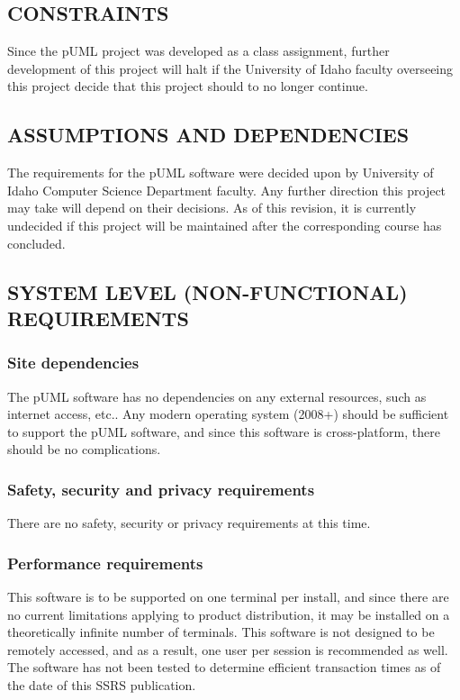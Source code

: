 \documentclass[twoside,letterpaper]{article}
\begin{document}
\subsection[CONSTRAINTS]{\bfseries
CONSTRAINTS}
{
Since the pUML project was developed as a class assignment,
further development of this project will halt if the University of Idaho faculty overseeing this project decide that this project should to no longer continue.
}

\subsection[ASSUMPTIONS AND DEPENDENCIES]{\bfseries
ASSUMPTIONS AND DEPENDENCIES}
{
The requirements for the pUML software were decided upon by University of Idaho Computer Science Department faculty.  Any further direction this project may take will depend on their decisions. As of this revision, it is currently undecided if this project will be maintained after the corresponding course has concluded. 
}




\subsection[SYSTEM LEVEL (NON{}-FUNCTIONAL)
REQUIREMENTS]{\bfseries
SYSTEM LEVEL (NON-FUNCTIONAL) REQUIREMENTS}

\subsubsection[Site dependencies]{\bfseries
Site dependencies}
{
The pUML software has no dependencies on any external resources, such as internet access, etc..
Any modern operating system (2008+) should be sufficient to support the pUML software,
and since this software is cross-platform, there should be no complications.
}

\subsubsection[Safety, security and privacy requirements]{\bfseries
Safety, security and privacy requirements}
{
There are no safety, security or privacy requirements at this time.
}

\subsubsection[Performance requirements]{\bfseries
Performance requirements}
{
This software is to be supported on one terminal per install, and since there are no current
 limitations applying to product distribution, it may be installed on a theoretically infinite 
number of terminals. This software is not designed to be remotely accessed, and as a result, 
one user per session is recommended as well.  The software has not been tested to determine 
efficient transaction times as of the date of this SSRS publication.
}
\end{document}
